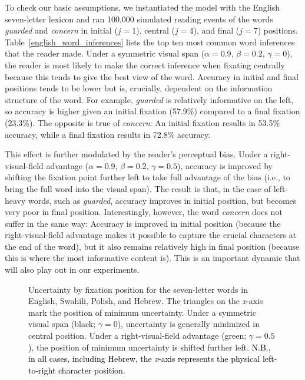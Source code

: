 \documentclass[doc,biblatex]{apa7}
\newcommand\newmaterial[1]{\textcolor{black}{#1}}
\begin{document}
To check our basic assumptions, we instantiated the model with the English seven-letter lexicon and ran 100,000 simulated reading events of the words \textit{guarded} and \textit{concern} in initial ($j=1$), central ($j=4$), and final ($j=7$) positions. Table~\ref{english_word_inferences} lists the top ten most common word inferences that the reader made. Under a symmetric visual span ($\alpha = 0.9$, $\beta = 0.2$, $\gamma = 0$), the reader is most likely to make the correct inference when fixating centrally because this tends to give the best view of the word. Accuracy in initial and final positions tends to be lower but is, crucially, dependent on the information structure of the word. For example, \textit{guarded} is relatively informative on the left, so accuracy is higher given an initial fixation (57.9\%) compared to a final fixation (23.3\%). The opposite is true of \textit{concern}: An initial fixation results in 53.5\% accuracy, while a final fixation results in 72.8\% accuracy.

This effect is further modulated by the reader's perceptual bias. Under a right-visual-field advantage ($\alpha = 0.9$, $\beta = 0.2$, $\gamma = 0.5$), accuracy is improved by shifting the fixation point further left to take full advantage of the bias (i.e., to bring the full word into the visual span). The result is that, in the case of left-heavy words, such as \textit{guarded}, accuracy improves in initial position, but becomes very poor in final position. Interestingly, however, the word \textit{concern} does not suffer in the same way: Accuracy is improved in initial position (because the right-visual-field advantage makes it possible to capture the crucial characters at the end of the word), but it also remains relatively high in final position (because this is where the most informative content is). This is an important dynamic that will also play out in our experiments.

\begin{figure}
\vspace*{2pt}
\caption{Uncertainty by fixation position for the seven-letter words in English, Swahili, Polish, and Hebrew. The triangles on the \textit{x}-axis mark the position of minimum uncertainty. Under a symmetric visual span (black; $\gamma=0$), uncertainty is generally minimized in central position. Under a right-visual-field advantage (green; $\gamma=0.5$), the position of minimum uncertainty is shifted further left. \newmaterial{N.B., in all cases, including Hebrew, the \textit{x}-axis represents the physical left-to-right character position.}}
\label{fig02}
\end{figure}
\end{document}
